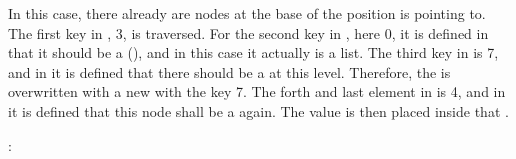 \documentclass[a4paper,10pt,english]{sphinxmanual}
\begin{document}
\sphinxAtStartPar
{}

\begin{sphinxVerbatim}[commandchars=\\\{\},numbers=left,firstnumber=1,stepnumber=1]
   \PYG{p}{[}\PYG{p}{[}  \PYG{p}{]}  \PYG{p}{]}
     
\end{sphinxVerbatim}

\sphinxAtStartPar
In this case, there already are nodes at the base of the position  is pointing to. The first key in , 3, is traversed. For the second key in , here 0, it is defined in  that it should be a  (), and in this case it actually is a list. The third key in  is 7, and in  it is defined that there should be a  at this level. Therefore, the  \sphinxcode{\sphinxupquote{{[}4, \{5: "c"\}{]}}} is overwritten with a new  with the key 7. The forth and last element in  is 4, and in  it is defined that this node shall be a  again. The value  is then placed inside that .

\sphinxAtStartPar
{}:
\end{document}
